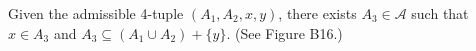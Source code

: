Given the admissible 4-tuple $(A_1, A_2, x, y)$, there exists $A_3 \in \mathcal{A}$ such that $x \in A_3$ and $A_3 \subseteq (A_1 \cup A_2) + \{y\}$. (See Figure B16.)
